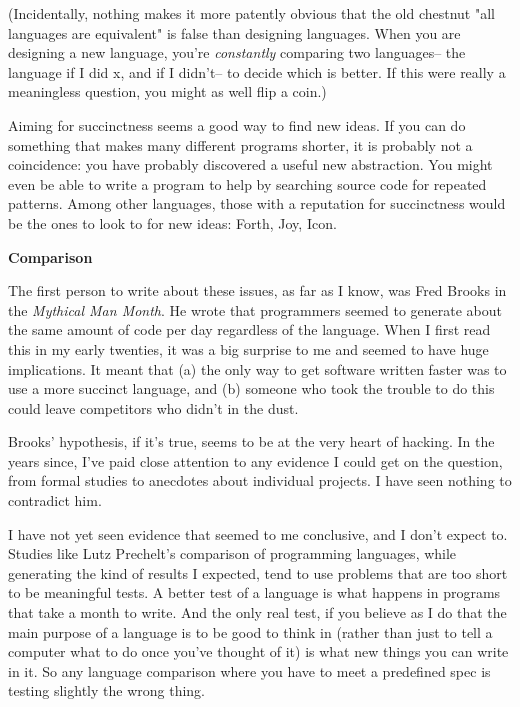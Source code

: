 (Incidentally,
                  nothing makes it more patently obvious that the old chestnut
                  "all languages are equivalent" is false than designing
                  languages. When you are designing a new language, you're
                  \emph{constantly} comparing two languages-- the language if I
                  did x, and if I didn't-- to decide which is better. If this
                  were really a meaningless question, you might as well flip a
                  coin.)

Aiming for succinctness seems a good way to
                  find new ideas. If you can do something that makes many
                  different programs shorter, it is probably not a coincidence:
                  you have probably discovered a useful new abstraction. You
                  might even be able to write a program to help by searching
                  source code for repeated patterns. Among other languages,
                  those with a reputation for succinctness would be the ones to
                  look to for new ideas: Forth, Joy, Icon.

\textbf{Comparison}

The first person to write about these issues, as
                  far as I know, was Fred Brooks in the
                  \emph{Mythical Man Month}. He wrote that programmers seemed to
                  generate about the same amount of code per day regardless of
                  the language. When I first read this in my early twenties, it
                  was a big surprise to me and seemed to have huge implications.
                  It meant that (a) the only way to get software written faster
                  was to use a more succinct language, and (b) someone who took
                  the trouble to do this could leave competitors who didn't in
                  the dust.

Brooks' hypothesis, if it's true, seems
                  to be at the very heart of hacking. In the years since, I've
                  paid close attention to any evidence I could get on the
                  question, from formal studies to anecdotes about individual
                  projects. I have seen nothing to contradict him.

I
                  have not yet seen evidence that seemed to me conclusive, and I
                  don't expect to. Studies like Lutz Prechelt's comparison of
                  programming languages, while generating the kind of results I
                  expected, tend to use problems that are too short to be
                  meaningful tests. A better test of a language is what happens
                  in programs that take a month to write. And the only real
                  test, if you believe as I do that the main purpose of a
                  language is to be good to think in (rather than just to tell a
                  computer what to do once you've thought of it) is what new
                  things you can write in it. So any language comparison where
                  you have to meet a predefined spec is testing slightly the
                  wrong thing.

